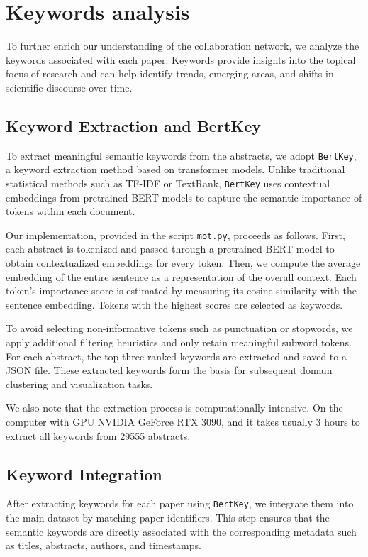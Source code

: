 \documentclass[12pt]{article}
\begin{document}
\section{Keywords analysis}

To further enrich our understanding of the collaboration network, we analyze the keywords associated with each paper. Keywords provide insights into the topical focus of research and can help identify trends, emerging areas, and shifts in scientific discourse over time.

\subsection{Keyword Extraction and BertKey}

To extract meaningful semantic keywords from the abstracts, we adopt \texttt{BertKey}, a keyword extraction method based on transformer models. Unlike traditional statistical methods such as TF-IDF or TextRank, \texttt{BertKey} uses contextual embeddings from pretrained BERT models to capture the semantic importance of tokens within each document.

Our implementation, provided in the script \texttt{mot.py}, proceeds as follows. First, each abstract is tokenized and passed through a pretrained BERT model to obtain contextualized embeddings for every token. Then, we compute the average embedding of the entire sentence as a representation of the overall context. Each token’s importance score is estimated by measuring its cosine similarity with the sentence embedding. Tokens with the highest scores are selected as keywords.

To avoid selecting non-informative tokens such as punctuation or stopwords, we apply additional filtering heuristics and only retain meaningful subword tokens. For each abstract, the top three ranked keywords are extracted and saved to a JSON file. These extracted keywords form the basis for subsequent domain clustering and visualization tasks.

We also note that the extraction process is computationally intensive. On the computer with GPU NVIDIA GeForce RTX 3090, and it takes usually 3 hours to extract all keywords from 29555 abstracts.

\subsection{Keyword Integration}

After extracting keywords for each paper using \texttt{BertKey}, we integrate them into the main dataset by matching paper identifiers. This step ensures that the semantic keywords are directly associated with the corresponding metadata such as titles, abstracts, authors, and timestamps.
\end{document}
